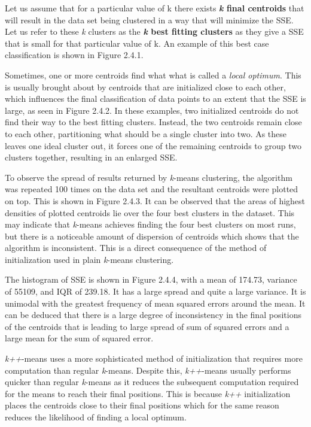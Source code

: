 \documentclass[12pt]{article}
\begin{document}
  \par Let us assume that for a particular value of k there exists \textbf{\textit{k} final centroids} that will result in the data set being clustered in a way that will minimize the SSE. Let us refer to these \textit{k} clusters as the \textbf{\textit{k} best fitting clusters} as they give a SSE that is small for that particular value of k. An example of this best case classification is shown in Figure 2.4.1.

  \par Sometimes, one or more centroids find what what is called a \textit{local optimum}. This is usually brought about by centroids that are initialized close to each other, which influences the final classification of data points to an extent that the SSE is large, as seen in Figure 2.4.2. In these examples, two initialized centroids do not find their way to the best fitting clusters. Instead, the two centroids remain close to each other, partitioning what should be a single cluster into two. As these leaves one ideal cluster out, it forces one of the remaining centroids to group two clusters together, resulting in an enlarged SSE.

  \par To observe the spread of results returned by \textit{k}-means clustering, the algorithm was repeated 100 times on the data set and the resultant centroids were plotted on top. This is shown in Figure 2.4.3. It can be observed that the areas of highest densities of plotted centroids lie over the four best clusters in the dataset. This may indicate that \textit{k}-means achieves finding the four best clusters on most runs, but there is a noticeable amount of dispersion of centroids which shows that the algorithm is inconsistent. This is a direct consequence of the method of initialization used in plain \textit{k}-means clustering.

  \par The histogram of SSE is shown in Figure 2.4.4, with a mean of 174.73, variance of 55109, and IQR of 239.18. It has a large spread and quite a large variance. It is unimodal with the greatest frequency of mean squared errors around the mean. It can be deduced that there is a large degree of inconsistency in the final positions of the centroids that is leading to large spread of sum of squared errors and a large mean for the sum of squared error.

  \pagebreak

  \par \textit{k++}-means uses a more sophisticated method of initialization that requires more computation than regular \textit{k}-means. Despite this, \textit{k++}-means usually performs quicker than regular \textit{k}-means as it reduces the subsequent computation required for the means to reach their final positions. This is because \textit{k++} initialization places the centroids close to their final positions which for the same reason reduces the likelihood of finding a local optimum.
\end{document}

